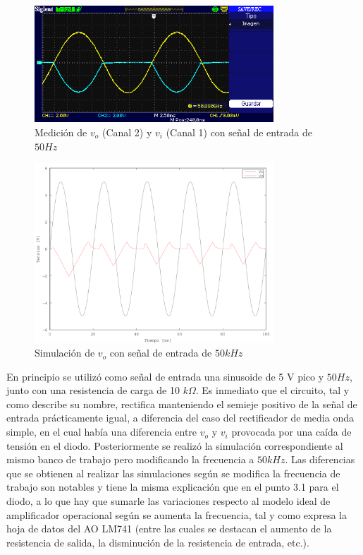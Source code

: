 \begin{figure}[H]
  \centering
      \includegraphics[width=0.8\textwidth]{gfxsantiago/FIG_MED_Rectificador_Precision_4A1.png}
  \caption{Medición de $v_{o}$ (Canal 2) y $v_{i}$ (Canal 1) con señal de entrada de $50Hz$}
\end{figure}

\begin{figure}[H]
  \centering
      \includegraphics[width=0.8\textwidth]{gfxsantiago/FIG_SIM_Rectificador_Precision_4A2.png}
  \caption{Simulación de $v_{o}$ con señal de entrada de $50kHz$}
\end{figure}
En principio se utilizó como señal de entrada una sinusoide de 5 V pico y $50Hz$, junto con una resistencia de carga de 10 $k\Omega$. Es inmediato que el circuito, tal y como describe su nombre, rectifica manteniendo el semieje positivo de la señal de entrada prácticamente igual, a diferencia del caso del rectificador de media onda simple, en el cual había una diferencia entre $v_{o}$ y $v_{i}$ provocada por una caída de tensión en el diodo. Posteriormente se realizó la simulación correspondiente al mismo banco de trabajo pero modificando la frecuencia a $50kHz$. Las diferencias que se obtienen al realizar las simulaciones según se modifica la frecuencia de trabajo son notables y tiene la misma explicación que en el punto 3.1 para el diodo, a lo que hay que sumarle las variaciones respecto al modelo ideal de amplificador operacional según se aumenta la frecuencia, tal y como expresa la hoja de datos del AO LM741 (entre las cuales se destacan el aumento de la resistencia de salida, la disminución de la resistencia de entrada, etc.).

